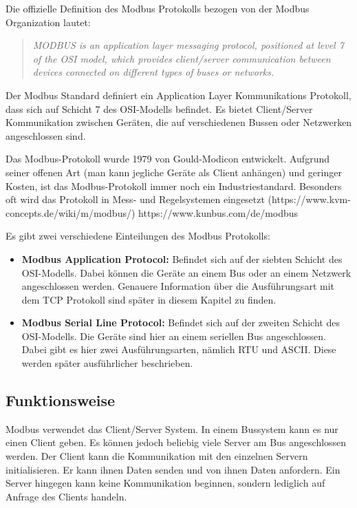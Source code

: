 Die offizielle Definition des Modbus Protokolls bezogen von der Modbus Organization \cite{Modbus_Organization_AP:2012} lautet:
\begin{quotation}
	\emph{
		MODBUS is an application layer messaging protocol, positioned at level 7 of the OSI model, which provides client/server communication between devices connected on different types of buses or networks.}
\end{quotation}

Der Modbus Standard definiert ein Application Layer Kommunikations Protokoll, dass sich auf Schicht 7 des OSI-Modells befindet. Es bietet Client/Server Kommunikation zwischen Geräten, die auf verschiedenen Bussen oder Netzwerken angeschlossen sind.

Das Modbus-Protokoll wurde 1979 von Gould-Modicon entwickelt. Aufgrund seiner offenen Art (man kann jegliche Geräte als Client anhängen) und geringer Kosten, ist das Modbus-Protokoll immer noch ein Industriestandard. Besonders oft wird das Protokoll in Mess- und Regelsystemen eingesetzt (https://www.kvm-concepts.de/wiki/m/modbus/)
https://www.kunbus.com/de/modbus 

Es gibt zwei verschiedene Einteilungen des Modbus Protokolls: 
\begin{itemize}
\item \textbf{Modbus Application Protocol:} Befindet sich auf der siebten Schicht des OSI-Modells. Dabei können die Geräte an einem Bus oder an einem Netzwerk angeschlossen werden. Genauere Information über die Ausführungsart mit dem TCP Protokoll sind später in diesem Kapitel zu finden.
\item \textbf{Modbus Serial Line Protocol:} Befindet sich auf der zweiten Schicht des OSI-Modells. Die Geräte sind hier an einem seriellen Bus angeschlossen. Dabei gibt es hier zwei Ausführungsarten, nämlich RTU und ASCII. Diese werden später ausführlicher beschrieben.
\end{itemize}
\cite{Modbus_Organization_AP:2012}
\cite{Modbus_Organization_SL:2012}

\subsection{Funktionsweise}
Modbus verwendet das Client/Server System. In einem Bussystem kann es nur einen Client geben. Es können jedoch beliebig viele Server am Bus angeschlossen werden. Der Client kann die Kommunikation mit den einzelnen Servern initialisieren. Er kann ihnen Daten senden und von ihnen Daten anfordern. Ein Server hingegen kann keine Kommunikation beginnen, sondern lediglich auf Anfrage des Clients handeln.

